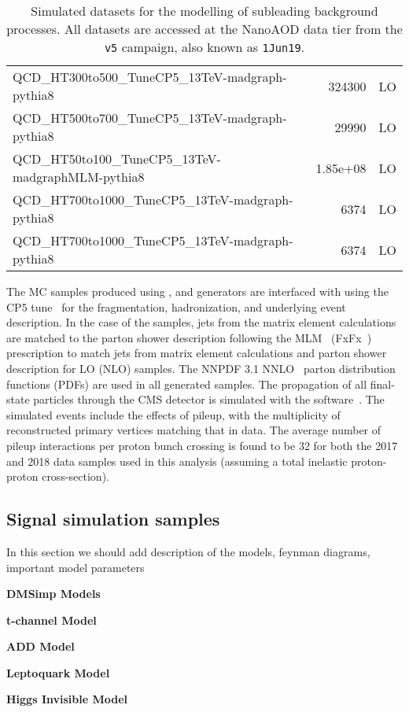 \begin{table}[ht!]
\begin{tabular}{l|r|c}
QCD\_HT300to500\_TuneCP5\_13TeV-madgraph-pythia8                                  & 324300         & LO  \\
QCD\_HT500to700\_TuneCP5\_13TeV-madgraph-pythia8                                  &  29990         & LO  \\
QCD\_HT50to100\_TuneCP5\_13TeV-madgraphMLM-pythia8                                &      1.85e+08  & LO  \\
QCD\_HT700to1000\_TuneCP5\_13TeV-madgraph-pythia8                                 &   6374         & LO  \\
QCD\_HT700to1000\_TuneCP5\_13TeV-madgraph-pythia8                                 &   6374         & LO  \\

\hline
\hline
\end{tabular}
\caption{Simulated datasets for the modelling of subleading background processes. All datasets are accessed at the NanoAOD data tier from the \texttt{v5} campaign, also known as \texttt{1Jun19}.}
\label{tab:BackgroundSamples_2}
\end{table}

The MC samples produced using \MGvATNLO, and \POWHEG
generators are interfaced with \PYTHIA using the CP5 tune~\cite{Sirunyan:2019dfx}
for the fragmentation, hadronization, and underlying event description.
In the case of the \MGvATNLO samples, jets from the matrix element calculations
are matched to the parton shower description following the MLM~\cite{Mangano:2006rw} (FxFx~\cite{Frederix:2012ps})
prescription to match jets from matrix element calculations and parton shower description for LO (NLO) samples.
The NNPDF 3.1 NNLO~\cite{Ball:2017nwa}
parton distribution functions (PDFs) are used in all generated samples.
The propagation of all final-state particles through the CMS detector
is simulated with the  software~\cite{Agostinelli:2002hh}.
The simulated events include the effects of pileup, with the multiplicity of reconstructed primary
vertices matching that in data. The average number of pileup interactions per proton bunch crossing
is found to be 32 for both the 2017 and 2018 data samples used in this analysis (assuming a total inelastic proton-proton cross-section).

\subsection{Signal simulation samples}

{\color{red} In this section we should add description of the models, feynman diagrams, important model parameters}

{\color{red} {\bf DMSimp Models}}

{\color{red} {\bf t-channel Model}}

{\color{red} {\bf ADD Model}}

{\color{red} {\bf Leptoquark Model}}

{\color{red} {\bf Higgs Invisible Model}}
